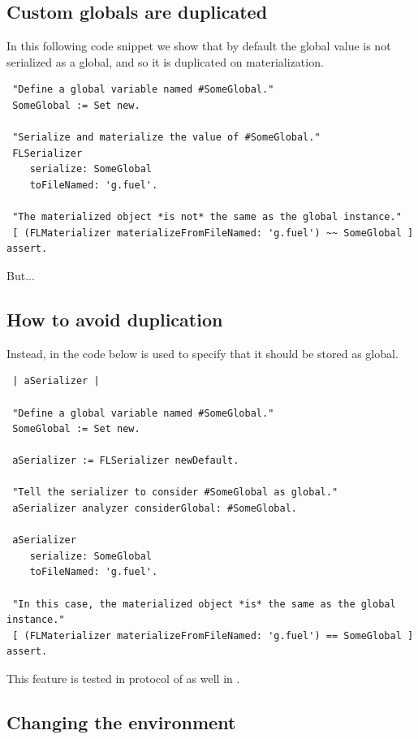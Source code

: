 \documentclass[a4paper,10pt,twoside]{book}
\begin{document}
\subsection{Custom globals are duplicated}

In this following code snippet we show that by default the global value is not serialized as a global, and so it is duplicated on materialization.

\begin{lstlisting}
 "Define a global variable named #SomeGlobal."
 SomeGlobal := Set new.
 
 "Serialize and materialize the value of #SomeGlobal."
 FLSerializer 
 	serialize: SomeGlobal 
 	toFileNamed: 'g.fuel'.
 
 "The materialized object *is not* the same as the global instance."
 [ (FLMaterializer materializeFromFileNamed: 'g.fuel') ~~ SomeGlobal ] assert.
\end{lstlisting}

But...

\subsection{How to avoid duplication}

Instead, in the code below  is used to specify that it should be stored as global.

\begin{lstlisting}
 | aSerializer |
 
 "Define a global variable named #SomeGlobal."
 SomeGlobal := Set new.
 
 aSerializer := FLSerializer newDefault.
 
 "Tell the serializer to consider #SomeGlobal as global."
 aSerializer analyzer considerGlobal: #SomeGlobal.
 
 aSerializer 
 	serialize: SomeGlobal 
 	toFileNamed: 'g.fuel'.
 	
 "In this case, the materialized object *is* the same as the global instance."
 [ (FLMaterializer materializeFromFileNamed: 'g.fuel') == SomeGlobal ] assert.
\end{lstlisting}

This feature is tested in  protocol of  as well in .

\subsection{Changing the environment}
\end{document}

